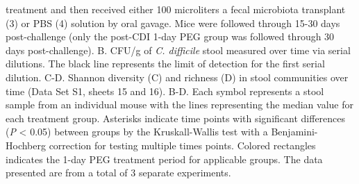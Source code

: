 \documentclass[
  11pt,
]{article}
\begin{document}
treatment and then received either 100 microliters a fecal microbiota
transplant (3) or PBS (4) solution by oral gavage. Mice were followed
through 15-30 days post-challenge (only the post-CDI 1-day PEG group was
followed through 30 days post-challenge). B. CFU/g of \emph{C.
difficile} stool measured over time via serial dilutions. The black line
represents the limit of detection for the first serial dilution. C-D.
Shannon diversity (C) and richness (D) in stool communities over time
(Data Set S1, sheets 15 and 16). B-D. Each symbol represents a stool
sample from an individual mouse with the lines representing the median
value for each treatment group. Asterisks indicate time points with
significant differences (\emph{P} \textless{} 0.05) between groups by
the Kruskall-Wallis test with a Benjamini-Hochberg correction for
testing multiple times points. Colored rectangles indicates the 1-day
PEG treatment period for applicable groups. The data presented are from
a total of 3 separate experiments. \newpage
\end{document}
